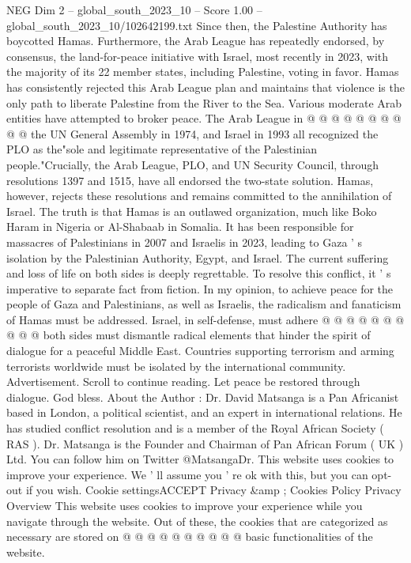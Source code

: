 \begin{textsample}{NEG Dim 2 – global\_south\_2023\_10 – Score 1.00 – global\_south\_2023\_10/102642199.txt}
Since then, the Palestine Authority has boycotted Hamas.
Furthermore, the Arab League has repeatedly endorsed, by consensus, the land-for-peace initiative with Israel, most recently in 2023, with the majority of its 22 member states, including Palestine, voting in favor.
Hamas has consistently rejected this Arab League plan and maintains that violence is the only path to liberate Palestine from the River to the Sea.
Various moderate Arab entities have attempted to broker peace.
The Arab League in @ @ @ @ @ @ @ @ @ @ the UN General Assembly in 1974, and Israel in 1993 all recognized the PLO as the"sole and legitimate representative of the Palestinian people."Crucially, the Arab League, PLO, and UN Security Council, through resolutions 1397 and 1515, have all endorsed the two-state solution.
Hamas, however, rejects these resolutions and remains committed to the annihilation of Israel.
The truth is that Hamas is an outlawed organization, much like Boko Haram in Nigeria or Al-Shabaab in Somalia.
It has been responsible for massacres of Palestinians in 2007 and Israelis in 2023, leading to Gaza ' s isolation by the Palestinian Authority, Egypt, and Israel.
The current suffering and loss of life on both sides is deeply regrettable.
To resolve this conflict, it ' s imperative to separate fact from fiction.
In my opinion, to achieve peace for the people of Gaza and Palestinians, as well as Israelis, the radicalism and fanaticism of Hamas must be addressed.
Israel, in self-defense, must adhere @ @ @ @ @ @ @ @ @ @ both sides must dismantle radical elements that hinder the spirit of dialogue for a peaceful Middle East.
Countries supporting terrorism and arming terrorists worldwide must be isolated by the international community.
Advertisement.
Scroll to continue reading.
Let peace be restored through dialogue.
God bless.
About the Author : Dr.
David Matsanga is a Pan Africanist based in London, a political scientist, and an expert in international relations.
He has studied conflict resolution and is a member of the Royal African Society ( RAS ).
Dr.
Matsanga is the Founder and Chairman of Pan African Forum ( UK ) Ltd.
You can follow him on Twitter @MatsangaDr.
This website uses cookies to improve your experience.
We ' ll assume you ' re ok with this, but you can opt-out if you wish.
Cookie settingsACCEPT Privacy \&amp ; Cookies Policy Privacy Overview This website uses cookies to improve your experience while you navigate through the website.
Out of these, the cookies that are categorized as necessary are stored on @ @ @ @ @ @ @ @ @ @ basic functionalities of the website.

\end{textsample}
